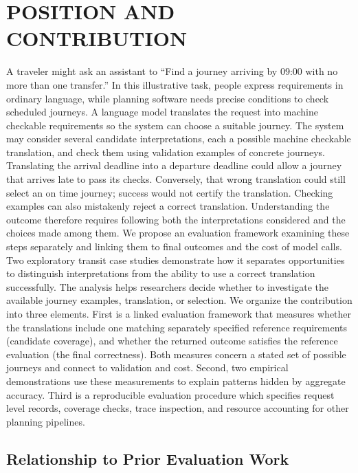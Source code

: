 \documentclass[a4paper,twoside]{article}
\begin{document}
\section{\uppercase{Position and Contribution}}
\label{sec:position}
\noindent A traveler might ask an assistant to ``Find a journey arriving by 09:00 with no more than one transfer.'' In this illustrative task, people express requirements in ordinary language, while planning software needs precise conditions to check scheduled journeys. A language model translates the request into machine checkable requirements so the system can choose a suitable journey.
The system may consider several candidate interpretations, each a possible machine checkable translation, and check them using validation examples of concrete journeys. Translating the arrival deadline into a departure deadline could allow a journey that arrives late to pass its checks. Conversely, that wrong translation could still select an on time journey; success would not certify the translation. Checking examples can also mistakenly reject a correct translation. Understanding the outcome therefore requires following both the interpretations considered and the choices made among them.
We propose an evaluation framework examining these steps separately and linking them to final outcomes and the cost of model calls. Two exploratory transit case studies demonstrate how it separates opportunities to distinguish interpretations from the ability to use a correct translation successfully. The analysis helps researchers decide whether to investigate the available journey examples, translation, or selection. We organize the contribution into three elements.
First is a linked evaluation framework that measures whether the translations include one matching separately specified reference requirements (candidate coverage), and whether the returned outcome satisfies the reference evaluation (the final correctness). Both measures concern a stated set of possible journeys and connect to validation and cost.
Second, two empirical demonstrations use these measurements to explain patterns hidden by aggregate accuracy.
Third is a reproducible evaluation procedure which specifies request level records, coverage checks, trace inspection, and resource accounting for other planning pipelines.


\subsection{Relationship to Prior Evaluation Work}
\end{document}

